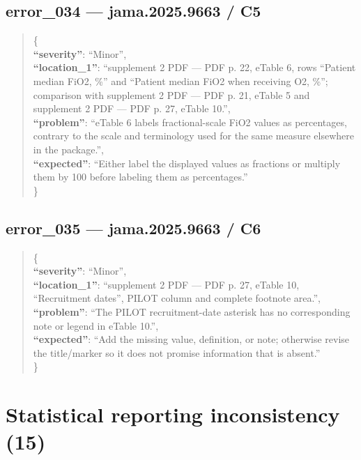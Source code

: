 \documentclass[
  letterpaper,
  9pt]{extreport}
\begin{document}
\hypertarget{error_034--jama20259663--c5}{%
\subsection{error\_034 --- jama.2025.9663 /
C5}\label{error_034--jama20259663--c5}}

\begin{quote}
\{\\
\textbf{``severity''}: ``Minor'',\\
\textbf{``location\_1''}: ``supplement 2 PDF --- PDF p. 22, eTable 6,
rows ``Patient median FiO2, \%'' and ``Patient median FiO2 when
receiving O2, \%''; comparison with supplement 2 PDF --- PDF p. 21,
eTable 5 and supplement 2 PDF --- PDF p. 27, eTable 10.'',\\
\textbf{``problem''}: ``eTable 6 labels fractional-scale FiO2 values as
percentages, contrary to the scale and terminology used for the same
measure elsewhere in the package.'',\\
\textbf{``expected''}: ``Either label the displayed values as fractions
or multiply them by 100 before labeling them as percentages.''\\
\}
\end{quote}

\hypertarget{error_035--jama20259663--c6}{%
\subsection{error\_035 --- jama.2025.9663 /
C6}\label{error_035--jama20259663--c6}}

\begin{quote}
\{\\
\textbf{``severity''}: ``Minor'',\\
\textbf{``location\_1''}: ``supplement 2 PDF --- PDF p. 27, eTable 10,
``Recruitment dates'', PILOT column and complete footnote area.'',\\
\textbf{``problem''}: ``The PILOT recruitment-date asterisk has no
corresponding note or legend in eTable 10.'',\\
\textbf{``expected''}: ``Add the missing value, definition, or note;
otherwise revise the title/marker so it does not promise information
that is absent.''\\
\}
\end{quote}

\hypertarget{statistical-reporting-inconsistency-15}{%
\section{Statistical reporting inconsistency
(15)}\label{statistical-reporting-inconsistency-15}}
\end{document}
